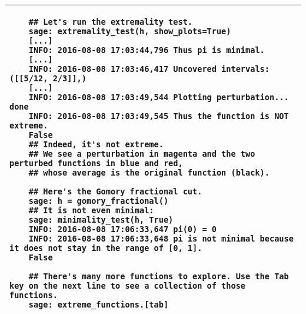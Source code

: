 \documentclass[10pt,reqno]{amsart}
\begin{document}
\begin{table}
\begin{tabular}{@{}p{\linewidth}@{}}
\begin{verbatim}
	## Let's run the extremality test.
	sage: extremality_test(h, show_plots=True)
	[...]
	INFO: 2016-08-08 17:03:44,796 Thus pi is minimal.
	[...]
	INFO: 2016-08-08 17:03:46,417 Uncovered intervals: ([[5/12, 2/3]],)
	[...]
	INFO: 2016-08-08 17:03:49,544 Plotting perturbation... done
	INFO: 2016-08-08 17:03:49,545 Thus the function is NOT extreme.
	False
	## Indeed, it's not extreme.  
	## We see a perturbation in magenta and the two perturbed functions in blue and red,
	## whose average is the original function (black).
	
	## Here's the Gomory fractional cut.
	sage: h = gomory_fractional()
	## It is not even minimal:
	sage: minimality_test(h, True)
	INFO: 2016-08-08 17:06:33,647 pi(0) = 0
	INFO: 2016-08-08 17:06:33,648 pi is not minimal because it does not stay in the range of [0, 1].
	False
	
	## There's many more functions to explore. Use the Tab key on the next line to see a collection of those functions.
	sage: extreme_functions.[tab]
	\end{verbatim}
    \\
	\bottomrule
  \end{tabular}
\end{table}
\end{document}
